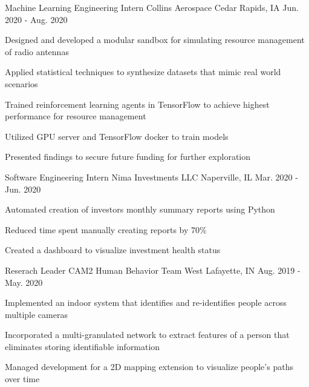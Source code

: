 
\begin{cventries}
  \cventry
    {Machine Learning Engineering Intern}
    {Collins Aerospace}
    {Cedar Rapids, IA}
    {Jun. 2020 - Aug. 2020}
    {
      \begin{cvitems}
          \item {Designed and developed a modular sandbox for simulating resource management of radio antennas}
          \item {Applied statistical techniques to synthesize datasets that mimic real world scenarios}
          \item{Trained reinforcement learning agents in TensorFlow to achieve highest performance for resource management}
          \item{Utilized GPU server and TensorFlow docker to train models}
          \item{Presented findings to secure future funding for further exploration}
      \end{cvitems}
    }
  \cventry
    {Software Engineering Intern} %
    {Nima Investments LLC} %
    {Naperville, IL} %
    {Mar. 2020 - Jun. 2020} %
    {
      \begin{cvitems} %
        \item{Automated creation of investors monthly summary reports using Python}
        \item{Reduced time spent manually creating reports by 70\%}
        \item{Created a dashboard to visualize investment health status}
      \end{cvitems}
    }
 
  \cventry
    {Reserach Leader} %
    {CAM2 Human Behavior Team} %
    {West Lafayette, IN} %
    {Aug. 2019 - May. 2020} %
    {
      \begin{cvitems} %
        \item{Implemented an indoor system that identifies and re-identifies people across multiple cameras}
        \item{Incorporated a multi-granulated network to extract features of a person that eliminates storing identifiable information}
        \item{Managed development for a 2D mapping extension to visualize people's paths over time}
      \end{cvitems}
    }
  

\end{cventries}
